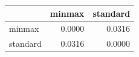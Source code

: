 \begin{tabular}{lrr}
\toprule
 & minmax & standard \\
\midrule
minmax & 0.0000 & 0.0316 \\
standard & 0.0316 & 0.0000 \\
\bottomrule
\end{tabular}
